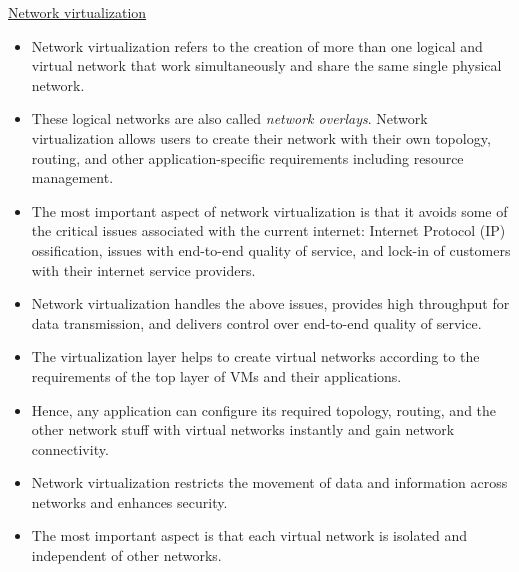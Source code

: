 \documentclass[a4paper, 12pt]{article}
\begin{document}
\underline{Network virtualization}
\begin{itemize}
\item
Network virtualization refers to the creation of more than one logical and virtual network that work simultaneously and share the same single physical network.
\item
These logical networks are also called \textit{network overlays}. Network virtualization allows users to create their network with their own topology, routing, and other application-specific requirements including resource management.
\item
The most important aspect of network virtualization is that it avoids some of the critical issues associated with the current internet: Internet Protocol (IP) ossification, issues with end-to-end quality of service, and lock-in of customers with their internet service providers.
\item
Network virtualization handles the above issues, provides high throughput for data transmission, and delivers control over end-to-end quality of service.
\item
The virtualization layer helps to create virtual networks according to the requirements of the top layer of VMs and their applications.
\item
Hence, any application can configure its required topology, routing, and the other network stuff with virtual networks instantly and gain network connectivity.
\item
Network virtualization restricts the movement of data and information across networks and enhances security.
\item
The most important aspect is that each virtual network is isolated and independent of other networks.
\end{itemize}
\end{document}
